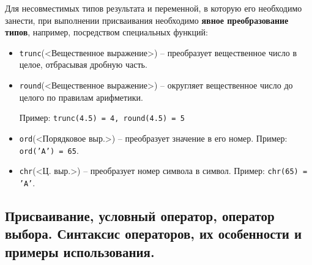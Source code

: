 Для несовместимых типов результата и переменной, в которую его необходимо занести, при выполнении присваивания необходимо \textbf{явное преобразование типов}, например, посредством специальных функций:
\begin{itemize}
\item \texttt{trunc}(<Вещественное выражение>) – преобразует вещественное число в целое, отбрасывая дробную часть.

\item \texttt{round}(<Вещественное выражение>) – округляет вещественное число до целого по правилам арифметики.

Пример:   \texttt{trunc(4.5) = 4,    round(4.5) = 5 }

\item \texttt{ord}(<Порядковое выр.>) – преобразует значение в его номер.
Пример:   \texttt{ord(’A’)  = 65}.

\item \texttt{chr}(<Ц. выр.>) – преобразует номер символа в символ.
Пример:   \texttt{chr(65) = ’A’}.
\end{itemize}




\newpage\subsection{Присваивание, условный оператор, оператор выбора. Синтаксис операторов, их особенности и примеры использования. }

\begin{myquote}
        
\end{myquote}

